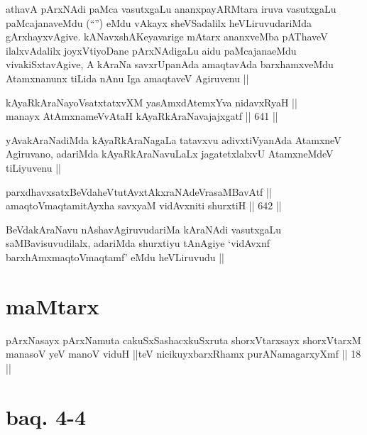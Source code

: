 \begin{artha}
athavA pArxNAdi paMca vasutxgaLu ananxpayARMtara iruva vasutxgaLu
paMcajanaveMdu (``\stext'') eMdu vAkayx sheVSadalilx heVLiruvudariMda
gArxhayxvAgive. kANavxshAKeyavarige mAtarx ananxveMba pAThaveV
ilalxvAdalilx joyxVtiyoDane pArxNAdigaLu aidu paMcajanaeMdu
vivakiSxtavAgive, A kAraNa savxrUpanAda amaqtavAda barxhamxveMdu
Atamxnanunx tiLida nAnu Iga amaqtaveV Agiruvenu ||
\end{artha}

\begin{shl}
kAyaRkAraNayoVsatxtatxvXM yasAmxdAtemxYva nidavxRyaH || \\
manayx AtAmxnameVvAtaH kAyaRkAraNavajajxgatf ||  641 ||  
\end{shl}

\begin{artha}
yAvakAraNadiMda kAyaRkAraNagaLa tatavxvu adivxtiVyanAda AtamxneV
Agiruvano, adariMda kAyaRkAraNavuLaLx jagatetxlalxvU AtamxneMdeV
tiLiyuvenu ||
\end{artha}


\begin{shl}
parxdhavxsatxBeVdaheVtutAvxtAkxraNAdeVrasaMBavAtf || \\
amaqtoV\s maqtamitAyxha savxyaM vidAvxniti shurxtiH ||  642 ||  
\end{shl}

\begin{artha}
BeVdakAraNavu nAshavAgiruvudariMa kAraNAdi vasutxgaLu
saMBavisuvudilalx, adariMda shurxtiyu tAnAgiye `vidAvxnf
barxhAmxmaqtoV\s maqtamf' eMdu heVLiruvudu ||
\end{artha}

\section*{maMtarx}

\begin{shl}
pArxNasayx pArxNamuta cakuSxSashacxkuSxruta shorxVtarxsayx shorxVtarxM manasoV yeV manoV viduH ||teV nicikuyxbarxRhamx purANamagarxyXmf || 18 ||
\end{shl}

\section*{baq. 4-4}


